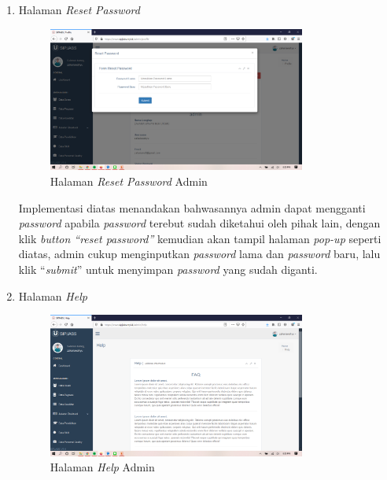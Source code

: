 \begin{enumerate}
	\newpage
	\item Halaman \textit{Reset Password}
	\begin{figure}
		\centering
		\includegraphics[width=0.8\textwidth]
		{pics/admin/implementasi/resetpassword.png}
		\caption{Halaman \textit{Reset Password} Admin}
		\label{fig:CC10}
	\end{figure}
	Implementasi diatas menandakan bahwasannya admin dapat mengganti \textit{password} apabila \textit{password} terebut sudah diketahui oleh pihak lain, dengan klik \textit{button “reset password”} kemudian akan tampil halaman \textit{pop-up} seperti diatas, admin cukup menginputkan \textit{password} lama dan \textit{password} baru, lalu klik “\textit{submit}” untuk menyimpan \textit{password} yang sudah diganti. 
	
	\item Halaman \textit{Help}
	\begin{figure}
		\centering
		\includegraphics[width=0.8\textwidth]
		{pics/admin/implementasi/help.png}
		\caption{Halaman \textit{Help} Admin}
		\label{fig:CC10}
	\end{figure}


\end{enumerate}
